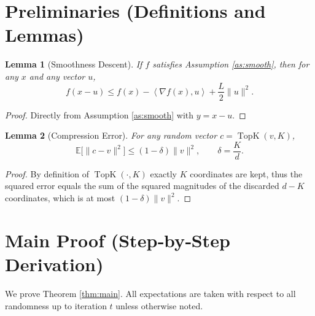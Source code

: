 \documentclass{article}
\newtheorem{lemma}{Lemma}
\newcommand{\TopK}[2]{\operatorname{TopK}\!\left(#1,#2\right)}
\newcommand{\E}{\mathbb{E}}
\newcommand{\ip}[2]{\left\langle #1,#2\right\rangle}
\begin{document}
\newpage
\section*{Preliminaries (Definitions and Lemmas)}
\begin{lemma}[Smoothness Descent]\label{lem:smooth}
If $f$ satisfies Assumption \ref{as:smooth}, then for any $x$ and any vector $u$,
\[
f(x-u)\le f(x)-\ip{\nabla f(x)}{u}+\frac{L}{2}\|u\|^{2}.
\]
\end{lemma}
\begin{proof}
Directly from Assumption \ref{as:smooth} with $y=x-u$.
\end{proof}

\begin{lemma}[Compression Error]\label{lem:compress}
For any random vector $c=\TopK{v}{K}$,
\[
\E\!\big[\|c-v\|^{2}\big]\le (1-\delta)\|v\|^{2},
\qquad \delta=\frac{K}{d}.
\]
\end{lemma}
\begin{proof}
By definition of $\TopK{\cdot}{K}$ exactly $K$ coordinates are kept, thus the squared error equals the sum of the squared magnitudes of the discarded $d-K$ coordinates, which is at most $(1-\delta)\|v\|^{2}$.
\end{proof}

\section*{Main Proof (Step‑by‑Step Derivation)}
We prove Theorem \ref{thm:main}.  All expectations are taken with respect to all randomness up to iteration $t$ unless otherwise noted.
\end{document}
